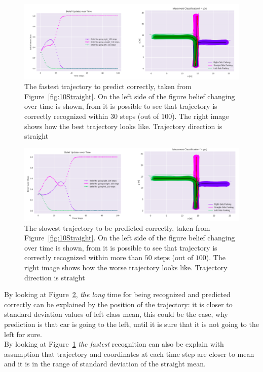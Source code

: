 \begin{figure}[H]
	\centering  	
	\includegraphics[width=13cm]{img/goodstr.png}
	\caption{The fastest trajectory to predict correctly, taken from Figure~\ref{fig:10Straight}. On the left side of the figure belief changing over time is shown, from it is possible to see that trajectory is correctly recognized within $30$ steps (out of $100$). The right image shows how the best trajectory looks like. Trajectory direction is straight}
	\label{fig:StraightGood}    
\end{figure}

\begin{figure}[H]
	\centering  	
	\includegraphics[width=13cm]{img/badstraight.png}
	\caption{The slowest trajectory to be predicted correctly, taken from Figure~\ref{fig:10Straight}. On the left side of the figure belief changing over time is shown, from it is possible to see that trajectory is correctly recognized within more than $50$ steps (out of $100$). The right image shows how the worse trajectory looks like. Trajectory direction is straight}
	\label{fig:StraightBad}    
\end{figure}

By looking at Figure~\ref{fig:StraightBad}, \textit{the long} time for being recognized and predicted correctly can be explained by the position of the trajectory: it is closer to standard deviation values of left class mean, this could be the case, why prediction is that car is going to the left, until it is sure that it is not going to the left for sure. \\
By looking at Figure~\ref{fig:StraightGood} \textit{the fastest} recognition can also be explain with assumption that trajectory and coordinates at each time step are closer to mean and it is in the range of standard deviation of the straight mean.

